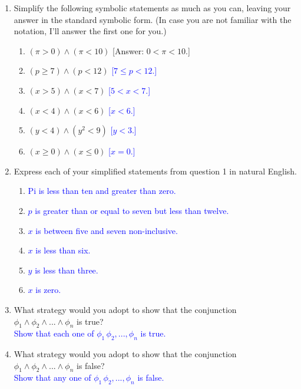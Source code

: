 \documentclass[13.5pt]{article}
\begin{document}
\begin{enumerate}
\item{Simplify the following symbolic statements as much as you can, leaving your answer in the standard symbolic form. (In case you are not familiar with the notation, I'll answer the first one for you.)
}\\

\begin{enumerate} 
  \item{\((\pi>0)\wedge(\pi<10)\)   [Answer: \(0 < \pi<10\).]}
  \item{\((p\geq7)\wedge(p<12)\)}   \textcolor{blue}{[\(7\leq p <12\).]} 
  \item{\((x>5)\wedge(x<7)\)}   \textcolor{blue}{[\(5<x<7\).]} 
  \item{\((x<4)\wedge(x<6)\)}   \textcolor{blue}{[\(x<6\).]} 
  \item{\((y<4)\wedge(y^2<9)\)}   \textcolor{blue}{[\(y<3\).]} 
  \item{\((x\geq0)\wedge(x\leq0)\)}   \textcolor{blue}{[\(x=0\).]} 
\end{enumerate}

\item{Express each of your simplified statements from question 1 in natural English.}

\begin{enumerate}
\item \textcolor{blue}{Pi is less than ten and greater than zero.}
\item \textcolor{blue}{\(p\) is greater than or equal to seven but less than twelve.}
\item \textcolor{blue}{\(x\) is between five and seven non-inclusive.}
\item \textcolor{blue}{\(x\) is less than six.}
\item \textcolor{blue}{\(y\) is less than three.}
\item \textcolor{blue}{\(x\) is zero.}

\end{enumerate}

\item{What strategy would you adopt to show that the conjunction \(\phi_1\wedge\phi_2\wedge...\wedge \phi_n\) is true? }\\
\textcolor{blue}{Show that each one of \(\phi_1\,\phi_2,...,\phi_n\) is true.}

\item{What strategy would you adopt to show that the conjunction \(\phi_1\wedge\phi_2\wedge...\wedge \phi_n\) is false? }\\
\textcolor{blue}{Show that any one of \(\phi_1\,\phi_2,...,\phi_n\) is false.}


\end{enumerate}
\end{document}
